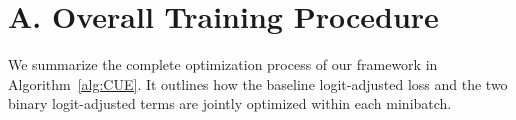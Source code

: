 \clearpage
\setcounter{page}{1}
\maketitlesupplementary



\section*{A. Overall Training Procedure}
We summarize the complete optimization process of our framework in Algorithm~\ref{alg:CUE}.
It outlines how the baseline logit-adjusted loss and the two binary logit-adjusted terms 
are jointly optimized within each minibatch.

